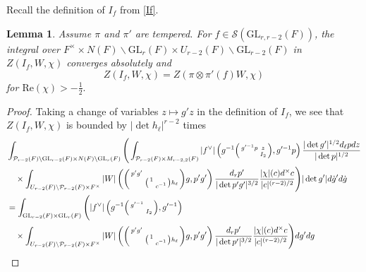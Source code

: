 \documentclass[12pt]{amsart}
\newtheorem{lem}[thm]{Lemma}
\theoremstyle{remark}
\numberwithin{equation}{section}
\newcommand{\GL}{\mathrm{GL}}
\theoremstyle{definition}
\newenvironment{psmatrix}
  {\left(\begin{smallmatrix}}
  {\end{smallmatrix}\right)}
\numberwithin{equation}{subsection}
\begin{document}
Recall the definition of $I_f$ from \eqref{If}.

\begin{lem} \label{lem:Zh}
Assume $\pi$ and $\pi'$ are tempered. For $f \in \mathcal{S}(\GL_{r,r-2}(F) )$,  the integral over $F^\times \times N(F) \backslash \GL_{r}(F) \times U_{r-2}(F) \backslash \GL_{r-2}(F)$ in $Z(I_f,W,\chi)$ converges absolutely and 
$$Z(I_{f},W,\chi)=Z(\pi \otimes \pi'(f)W,\chi)$$
for $\mathrm{Re}(\chi)>-\tfrac{1}{2}.$ 
\end{lem}

\begin{proof} 
Taking a change of variables $z \mapsto g'z$ in the definition of $I_f$, we see that
 $Z(I_{f},W,\chi)$ is bounded by $|\det h_\ell|^{r-2}$ times
\begin{align*}
    &\int_{\mathcal{P}_{r-2}(F) \backslash \GL_{r-2}(F) \times   N(F) \backslash \GL_{r}(F)}\Bigg(\int_{\mathcal{P}_{r-2}(F) \times M_{r-2,2}(F)} |f^\vee|\left( g^{-1}\begin{psmatrix} g'^{-1}p & z\\ & I_2 \end{psmatrix}, g'^{-1}p\right)\frac{|\det g'|^{1/2}d_\ell p dz}{|\det p|^{1/2} } 
    \\& \quad \times\int_{U_{r-2}(F) \backslash \mathcal{P}_{r-2}(F) \times F^\times}|W|\left(\begin{psmatrix} p'g' &  \\ & \begin{psmatrix} 1 & \\ & c^{-1}\end{psmatrix} h_\ell \end{psmatrix}g,p'g'\right)\frac{d_r p' }{|\det p'g'|^{3/2}} \frac{|\chi|(c)d^\times c}{|c|^{(r-2)/2}}\Bigg)|\det g'|d\dot{g}'d\dot{g} \\
    &=\int_{\GL_{r-2}(F) \times    \GL_{r}(F)}\Bigg( |f^\vee|\left( g^{-1}\begin{psmatrix} g'^{-1} & \\ & I_2 \end{psmatrix}, g'^{-1}\right) \\& \quad \times\int_{U_{r-2}(F) \backslash \mathcal{P}_{r-2}(F) \times F^\times}|W|\left(\begin{psmatrix} p'g' &  \\ & \begin{psmatrix} 1 & \\ & c^{-1}\end{psmatrix} h_\ell \end{psmatrix}g,p'g'\right)\frac{d_r p' }{|\det p'|^{3/2}} \frac{|\chi|(c)d^\times c}{|c|^{(r-2)/2}}\Bigg)dg'dg\\

\end{align*}
\end{proof}
\end{document}
